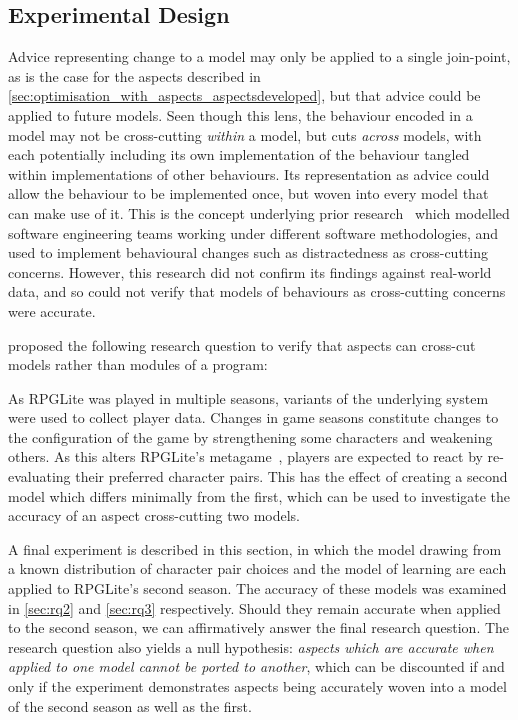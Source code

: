 \subsection{Experimental Design}

Advice representing change to a model may only be applied to a single
join-point, as is the case for the aspects described in
\cref{sec:optimisation_with_aspects_aspectsdeveloped}, but that advice could be
applied to future models. Seen though this lens, the behaviour encoded in a
model may not be cross-cutting \emph{within} a model, but cuts \emph{across}
models, with each potentially including its own implementation of the behaviour
tangled within implementations of other behaviours. Its representation as advice
could allow the behaviour to be implemented once, but woven into every model
that can make use of it. This is the concept underlying prior
research~\cite{wallis2018caise} which modelled software engineering teams
working under different software methodologies, and used \aop{} to implement
behavioural changes such as distractedness as cross-cutting concerns. However,
this research did not confirm its findings against real-world data, and so could
not verify that models of behaviours as cross-cutting concerns were accurate.

 proposed the following research question to verify that
aspects can cross-cut models rather than modules of a program:

\begin{researchquestion}
  \rqfour{}
\end{researchquestion}

As RPGLite was played in multiple seasons, variants of the underlying system
were used to collect player data. Changes in game seasons constitute changes to
the configuration of the game by strengthening some characters and weakening
others. As this alters RPGLite's metagame~\cite{kavanagh2021thesis}, players are
expected to react by re-evaluating their preferred character pairs. This has the
effect of creating a second model which differs minimally from the first, which
can be used to investigate the accuracy of an aspect cross-cutting two models.

A final experiment is described in this section, in which the model drawing from
a known distribution of character pair choices and the model of learning are
each applied to RPGLite's second season. The accuracy of these models was
examined in \cref{sec:rq2} and \cref{sec:rq3} respectively. Should they remain
accurate when applied to the second season, we can affirmatively answer the
final research question. The research question also yields a null hypothesis:
\emph{aspects which are accurate when applied to one model cannot be ported to
another}, which can be discounted if and only if the experiment
demonstrates aspects being accurately woven into a model of the second season as
well as the first. 

